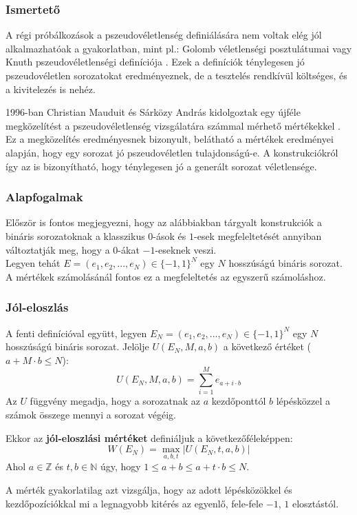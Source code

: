 \documentclass[hidelinks, 12pt]{article}
\begin{document}
	\subsubsection*{Ismertető}
	A régi próbálkozások a pszeudovéletlenség definiálására nem voltak elég jól alkalmazhatóak a gyakorlatban, mint pl.: Golomb véletlenségi posztulátumai vagy Knuth pszeudovéletlenségi definíciója \cite{knuth}. Ezek a definíciók ténylegesen jó pszeudovéletlen sorozatokat eredményeznek, de a tesztelés rendkívül költséges, és a kivitelezés is nehéz.
	
	1996-ban Christian Mauduit és Sárközy András kidolgoztak egy újféle megközelítést a pszeudovéletlenség vizsgálatára számmal mérhető mértékekkel \cite{sarkozymauduit}. Ez a megközelítés eredményesnek bizonyult, belátható a mértékek eredményei alapján, hogy egy sorozat jó pszeudovéletlen tulajdonságú-e. A konstrukciókról így az is bizonyítható, hogy ténylegesen jó a generált sorozat véletlensége.
	\subsubsection*{Alapfogalmak}
	Először is fontos megjegyezni, hogy az alábbiakban tárgyalt konstrukciók a bináris sorozatoknak a klasszikus $0$-ások és $1$-esek megfeleltetését annyiban változtatják meg, hogy a $0$-ákat $-1$-eseknek veszi. \\
	Legyen tehát $E=(e_1, e_2, ..., e_N) \in \{-1, 1\}^N$ egy $N$ hosszúságú bináris sorozat. A mértékek számolásánál fontos ez a megfeleltetés az egyszerű számoláshoz.
	\subsubsection{Jól-eloszlás}
	A fenti definícióval együtt, legyen $E_N=(e_1, e_2, ..., e_N) \in \{-1, 1\}^N$ egy $N$ hosszúságú bináris sorozat. Jelölje $U(E_N, M, a, b)$ a következő értéket ($a+M\cdot b \leq N$):
	$$U(E_N, M, a, b) = \sum_{i=1}^{M}e_{a+i\cdot b}$$
	Az $U$ függvény megadja, hogy a sorozatnak az $a$ kezdőponttól $b$ lépésközzel a számok összege mennyi a sorozat végéig.
	
	Ekkor az \textbf{jól-eloszlási mértéket} definiáljuk a következőféleképpen:
	$$W(E_N) = \max_{a, b, t}{|U(E_N, t, a, b)|}$$
	Ahol $a \in \mathbb{Z}$ és $t, b \in \mathbb{N}$ úgy, hogy $1 \leq a+b \leq a+t\cdot b \leq N$.
	
	A mérték gyakorlatilag azt vizsgálja, hogy az adott lépésközökkel és kezdőpozíciókkal mi a legnagyobb kitérés az egyenlő, fele-fele $-1$, $1$ elosztástól.
	
\end{document}
